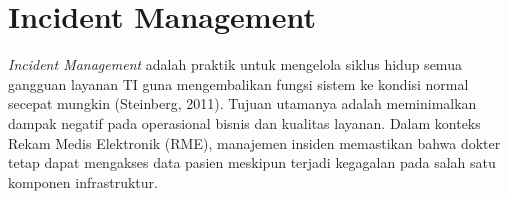 \section{Incident Management}
\textit{Incident Management} adalah praktik untuk mengelola siklus hidup semua gangguan layanan TI guna mengembalikan fungsi sistem ke kondisi normal secepat mungkin (Steinberg, 2011). Tujuan utamanya adalah meminimalkan dampak negatif pada operasional bisnis dan kualitas layanan. Dalam konteks Rekam Medis Elektronik (RME), manajemen insiden memastikan bahwa dokter tetap dapat mengakses data pasien meskipun terjadi kegagalan pada salah satu komponen infrastruktur.